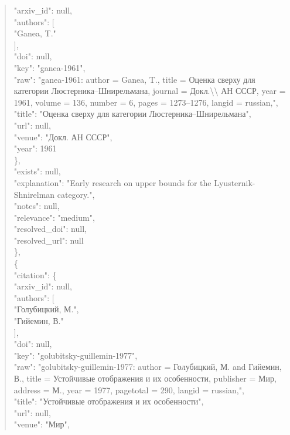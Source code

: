 \documentclass[11pt]{article}
\begin{document}
\begin{quote}
        "arxiv\_id": null,\\
        "authors": [\\
          "Ganea, T."\\
        ],\\
        "doi": null,\\
        "key": "ganea-1961",\\
        "raw": "ganea-1961: author = Ganea, T., title = Оценка сверху для категории Люстерника--Шнирельмана, journal = Докл.\textbackslash{}\textbackslash{} АН СССР, year = 1961, volume = 136, number = 6, pages = 1273--1276, langid = russian,",\\
        "title": "Оценка сверху для категории Люстерника--Шнирельмана",\\
        "url": null,\\
        "venue": "Докл. АН СССР",\\
        "year": 1961\\
      \},\\
      "exists": null,\\
      "explanation": "Early research on upper bounds for the Lyusternik-Shnirelman category.",\\
      "notes": null,\\
      "relevance": "medium",\\
      "resolved\_doi": null,\\
      "resolved\_url": null\\
    \},\\
    \{\\
      "citation": \{\\
        "arxiv\_id": null,\\
        "authors": [\\
          "Голубицкий, М.",\\
          "Гийемин, В."\\
        ],\\
        "doi": null,\\
        "key": "golubitsky-guillemin-1977",\\
        "raw": "golubitsky-guillemin-1977: author = Голубицкий, М. and Гийемин, В., title = Устойчивые отображения и их особенности, publisher = Мир, address = М., year = 1977, pagetotal = 290, langid = russian,",\\
        "title": "Устойчивые отображения и их особенности",\\
        "url": null,\\
        "venue": "Мир",\\

\end{quote}
\end{document}
